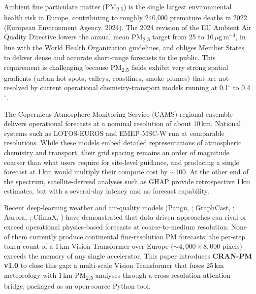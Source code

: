 
Ambient fine particulate matter (PM\textsubscript{2.5}) is the
single largest environmental health risk in Europe, contributing to
roughly 240{,}000 premature deaths in 2022 (European Environment
Agency, 2024). The 2024 revision of the EU Ambient Air Quality
Directive lowers the annual mean PM\textsubscript{2.5} target from
25 to 10\,$\mu$g\,m$^{-3}$, in line with the World Health Organization
guidelines, and obliges Member States to deliver dense and accurate
short-range forecasts to the public. This requirement is challenging
because PM\textsubscript{2.5} fields exhibit very strong spatial
gradients (urban hot-spots, valleys, coastlines, smoke plumes)
that are not resolved by current operational chemistry-transport
models running at 0.1$^\circ$ to 0.4$^\circ$.

The Copernicus Atmosphere Monitoring Service (CAMS) regional
ensemble \citep{cams} delivers operational forecasts at a nominal
resolution of about 10\,km. National systems such as LOTOS-EUROS
\citep{schaap2008lotos} and EMEP-MSC-W \citep{simpson2012emep} run
at comparable resolutions. While these models embed detailed
representations of atmospheric chemistry and transport, their grid
spacing remains an order of magnitude coarser than what users
require for site-level guidance, and producing a single forecast at
1\,km would multiply their compute cost by $\sim$100. At the other
end of the spectrum, satellite-derived analyses such as
GHAP \citep{wei2023ghap} provide retrospective 1\,km estimates,
but with a several-day latency and no forecast capability.

Recent deep-learning weather and air-quality models (Pangu,
\citealp{bi2023pangu}; GraphCast, \citealp{lam2023graphcast};
Aurora, \citealp{bodnar2024aurora}; ClimaX, \citealp{nguyen2023climax})
have demonstrated that data-driven approaches can rival or exceed
operational physics-based forecasts at coarse-to-medium resolution.
None of them currently produce continental fine-resolution PM
forecasts: the per-step token count of a 1\,km Vision Transformer over
Europe ($\sim 4{,}000 \times 8{,}000$ pixels) exceeds the memory of
any single accelerator. This paper introduces \textbf{CRAN-PM v1.0}
to close this gap: a multi-scale Vision Transformer that fuses
25\,km meteorology with 1\,km PM\textsubscript{2.5} analyses through
a cross-resolution attention bridge, packaged as an open-source
Python tool.

